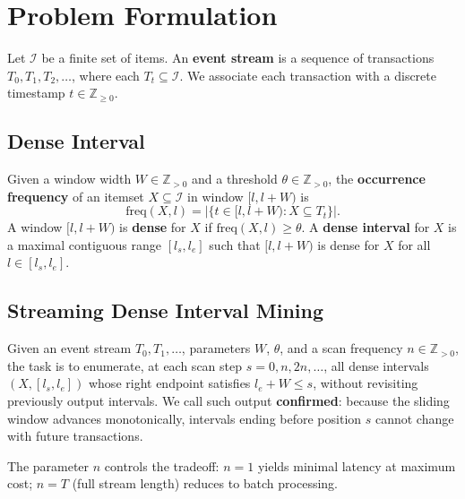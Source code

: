 \section{Problem Formulation}

Let $\mathcal{I}$ be a finite set of items.
An \textbf{event stream} is a sequence of transactions
$T_0, T_1, T_2, \ldots$, where each $T_t \subseteq \mathcal{I}$.
We associate each transaction with a discrete timestamp $t \in \mathbb{Z}_{\geq 0}$.

\subsection{Dense Interval}

Given a window width $W \in \mathbb{Z}_{>0}$ and a threshold $\theta \in \mathbb{Z}_{>0}$,
the \textbf{occurrence frequency} of an itemset $X \subseteq \mathcal{I}$
in window $[l, l+W)$ is
\[
  \mathrm{freq}(X, l) = |\{t \in [l, l+W) : X \subseteq T_t\}|.
\]
A window $[l, l+W)$ is \textbf{dense} for $X$ if $\mathrm{freq}(X, l) \geq \theta$.
A \textbf{dense interval} for $X$ is a maximal contiguous range
$[l_s, l_e]$ such that $[l, l+W)$ is dense for $X$ for all $l \in [l_s, l_e]$.

\subsection{Streaming Dense Interval Mining}

Given an event stream $T_0, T_1, \ldots$, parameters $W$, $\theta$, and
a scan frequency $n \in \mathbb{Z}_{>0}$, the task is to enumerate,
at each scan step $s = 0, n, 2n, \ldots$, all dense intervals
$(X, [l_s, l_e])$ whose right endpoint satisfies $l_e + W \leq s$,
without revisiting previously output intervals.
We call such output \textbf{confirmed}: because the sliding window
advances monotonically, intervals ending before position $s$
cannot change with future transactions.

The parameter $n$ controls the tradeoff:
$n = 1$ yields minimal latency at maximum cost;
$n = T$ (full stream length) reduces to batch processing.
